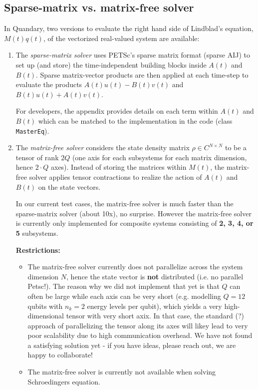 \documentclass[11pt]{article}
\begin{document}
 \subsection{Sparse-matrix vs. matrix-free solver}

   In Quandary, two versions to evaluate the right hand side of Lindblad's
   equation, $M(t)q(t)$, of the vectorized real-valued system are available: 
   \begin{enumerate}
     \item The \textit{sparse-matrix solver} uses PETSc's sparse matrix format (sparse AIJ) to set up (and store) the time-independent building blocks inside $A(t)$ and $B(t)$. Sparse matrix-vector products are then applied at each time-step to evaluate the products $A(t)u(t) - B(t) v(t)$ and $B(t)u(t) + A(t)v(t)$.  
     
     For developers, the appendix provides details on each term within $A(t)$ and $B(t)$ which can be matched to the implementation in the code (class \texttt{MasterEq}). 

     \item The \textit{matrix-free solver} considers the state density matrix $\rho\in C^{N\times N}$ to be a tensor of rank $2Q$ (one axis for each subsystems for each matrix dimension, hence $2\cdot Q$ axes). Instead of storing the matrices within $M(t)$, the matrix-free solver applies tensor contractions to realize the action of $A(t)$ and $B(t)$ on the state vectors. 

    In our current test cases, the matrix-free solver is much faster than the sparse-matrix solver (about 10x), no surprise. However the matrix-free solver is currently only implemented for composite systems consisting of \textbf{2, 3, 4, or 5} subsystems. 

    \textbf{Restrictions:} 
    \begin{itemize}
      \item The matrix-free solver currently does not parallelize across the system dimension $N$, hence the state vector is \textbf{not} distributed (i.e. no parallel Petsc!). The reason why we did not implement that yet is that $Q$ can often be large while each axis can be very short (e.g. modelling $Q=12$ qubits with $n_k=2$ energy levels per qubit), which yields a very high-dimensional tensor with very short axix. In that case, the standard (?) approach of parallelizing the tensor along its axes will likey lead to very poor scalability due to high communication overhead. We have not found a satisfying solution yet - if you have ideas, please reach out, we are happy to collaborate! 
      \item {The matrix-free solver is currently not available when solving Schroedingers equation.}
    \end{itemize}
   \end{enumerate} 
\end{document}
